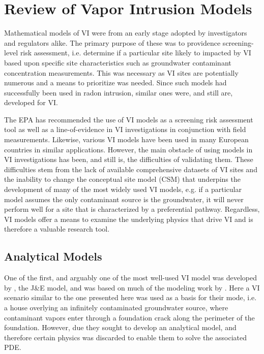 \section{Review of Vapor Intrusion Models}\label{sec:model_review}

Mathematical models of VI were from an early stage adopted by investigators and regulators alike.
The primary purpose of these was to providence screening-level risk assessment, i.e. determine if a particular site likely to impacted by VI based upon specific site characteristics such as groundwater contaminant concentration measurements.
This was necessary as VI sites are potentially numerous and a means to prioritize was needed.
Since such models had successfully been used in radon intrusion, similar ones were, and still are, developed for VI\cite{u.s._environmental_protection_agency_oswer_2015}.\par

The EPA has recommended the use of VI models as a screening risk assessment tool as well as a line-of-evidence in VI investigations in conjunction with field measurements\cite{u.s._environmental_protection_agency_oswer_2015}.
Likewise, various VI models have been used in many European countries in similar applications\cite{provoost_accuracy_2009}.
However, the main obstacle of using models in VI investigations has been, and still is, the difficulties of validating them.
These difficulties stem from the lack of available comprehensive datasets of VI sites and the inability to change the conceptual site model (CSM) that underpins the development of many of the most widely used VI models, e.g. if a particular model assumes the only contaminant source is the groundwater, it will never perform well for a site that is characterized by a preferential pathway.
Regardless, VI models offer a means to examine the underlying physics that drive VI and is therefore a valuable research tool.\par

\subsection{Analytical Models}

One of the first, and arguably one of the most well-used VI model was developed by \citeauthor{johnson_heuristic_1991}\cite{johnson_heuristic_1991}, the J\&E model, and was based on much of the modeling work by \citeauthor{nazaroff_predicting_1988}\cite{nazaroff_predicting_1988}.
Here a VI scenario similar to the one presented here was used as a basis for their mode, i.e. a house overlying an infinitely contaminated groundwater source, where contaminant vapors enter through a foundation crack along the perimeter of the foundation.
However, due they sought to develop an analytical model, and therefore certain physics was discarded to enable them to solve the associated PDE.\par

